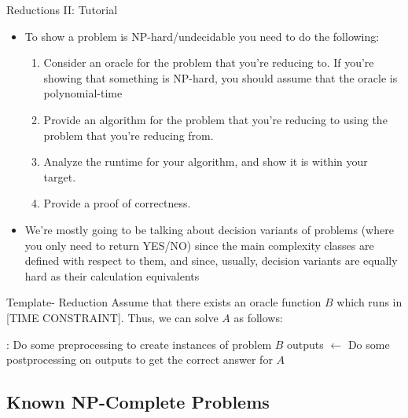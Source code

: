 \documentclass{beamer}
\begin{document}
\begin{frame}[t]{Reductions II: Tutorial}
    \begin{itemize}
        \item To show a problem is NP-hard/undecidable you need to do the following:
        \begin{enumerate}
            \item \pause Consider an oracle for the problem that you're reducing to. If you're showing that something is NP-hard, you should assume that the oracle is polynomial-time
            \item  \pause Provide an algorithm for the problem that you're reducing to using the problem that you're reducing from.
            \item \pause Analyze the runtime for your algorithm, and show it is within your target.
            \item \pause Provide a proof of correctness.
        \end{enumerate}
        \item \pause We're mostly going to be talking about \alert{decision variants} of problems (where you only need to return YES/NO) since the main complexity classes are defined with respect to them, and since, usually, decision variants are equally hard as their calculation equivalents
    \end{itemize}
    \pause \begin{exampleblock}{Template- Reduction}
    Assume that there exists an oracle function $B$ which runs in [TIME CONSTRAINT]. Thus, we can solve $A$ as follows:
            \begin{algorithmic}[1]
                :
                    \State Do some preprocessing to create instances of problem $B$
                    \State outputs $\gets$ 
                    \State Do some postprocessing on outputs to get the correct answer for $A$
                \EndProcedure
            \end{algorithmic}
            
        \end{exampleblock}
\end{frame}

\subsection{Known NP-Complete Problems}
\end{document}
